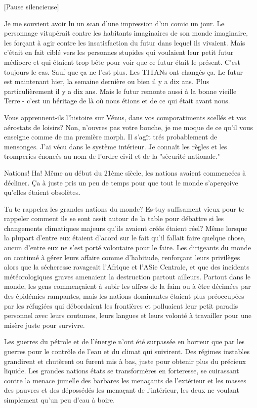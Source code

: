 [Pause silencieuse] 

Je me souvient avoir lu un scan d'une impression d'un comic un jour. Le personnage vitupérait contre les habitants imaginaires de son monde imaginaire, les forçant à agir contre les insatisfaction du futur dans lequel ils vivaient. Mais c'était en fait ciblé vers les personnes stupides qui voulaient leur petit futur médiocre et qui étaient trop bête pour voir que ce futur était le présent. C'est toujours le cas. Sauf que ça ne l'est plus. Les TITANs ont changés ça. Le futur est maintenant hier, la semaine dernière ou bien il y a dix ans. Plus particulièrement il y a dix ans. Mais le futur remonte aussi à la bonne vieille Terre - c'est un héritage de là où nous étions et de ce qui était avant nous. 

Vous apprennent-ils l'histoire sur Vénus, dans vos comporatiments scellés et vos aérostats de loisirs? Non, n'ouvres pas votre bouche, je me moque de ce qu'il vous enseigne comme de ma première morph. Il s'agît trés probablement de mensonges. J'ai vécu dans le système intérieur. Je connaît les règles et les tromperies énoncés au nom de l'ordre civil et de la "sécurité nationale." 

Nations! Ha! Même au début du 21ème siècle, les nations avaient commencées à décliner. Ça à juste pris un peu de temps pour que tout le monde s'aperçoive qu'elles étaient obsolètes. 

Tu te rappelez les grandes nations du monde? Es-tuy suffisament vieux pour te rappeler comment ils se sont assit autour de la table pour débattre si les changements climatiques majeurs qu'ils avaient créés étaient réel? Même lorsque la plupart d'entre eux étaient d'acord sur le fait qu'il fallait faire quelque chose, aucun d'entre eux ne s'est porté volontaire pour le faire. Les dirigeants du monde on continué à gérer leurs affaire comme d'habitude, renforçant leurs privilèges alors que la sécheresse ravageait l'Afrique et l'ASie Centrale, et que des incidents météorologiques graves amenaient la destruction partout ailleurs. Partout dans le monde, les gens commençaient à subir les affres de la faim ou à être décimées par des épidémies rampantes, mais les nations dominantes étaient plus préoccupées par les réfugiées qui débordaient les frontières et polluaient leur petit paradis personnel avec leurs coutumes, leurs langues et leurs volonté à travailler pour une misère juste pour survivre. 

Les guerres du pétrole et de l'énergie n'ont été surpassée en horreur que par les guerres pour le contrôle de l'eau et du climat qui suivirent. Des régimes instables grandirent et chutèrent ou furent mis à bas, juste pour obtenir plus du précieux liquide. Les grandes nations états se transformères en forteresse, se cuirassant contre la menace jumelle des barbares les menaçants de l'extérieur et les masses des pauvres et des dépossédés les menaçant de l'intérieur, les deux ne voulant simplement qu'un peu d'eau à boire. 

